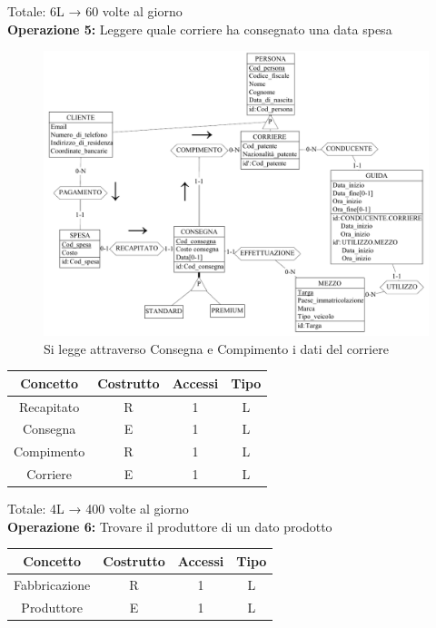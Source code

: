 \documentclass[a4paper,12pt]{report}
\begin{document}
Totale: 6L → 60 volte al giorno\\
\textbf{Operazione 5:}
Leggere quale corriere ha consegnato una data spesa\\
\begin{figure}[H]
	\centering{}
	\includegraphics[width=\textwidth]{img/Operazione5.pdf}
	\caption{Si legge attraverso Consegna e Compimento i dati del corriere}
\end{figure}
\begin{center}
    \begin{tabular}{ | c   c   c   c | } 
    \hline
	Concetto&Costrutto&Accessi&Tipo\\
	\hline
	Recapitato&R&1&L\\
	\hline
    Consegna&E&1&L\\
	\hline
	Compimento&R&1&L\\
	\hline
	Corriere&E&1&L\\
	\hline
	\end{tabular}
\end{center}
Totale: 4L → 400 volte al giorno\\
\textbf{Operazione 6:}
Trovare il produttore di un dato prodotto\\
\begin{center}
    \begin{tabular}{ | c   c   c   c | } 
    \hline
	Concetto&Costrutto&Accessi&Tipo\\
	\hline
	Fabbricazione&R&1&L\\
	\hline
    Produttore&E&1&L\\
	\hline
	\end{tabular}
\end{center}
\end{document}
